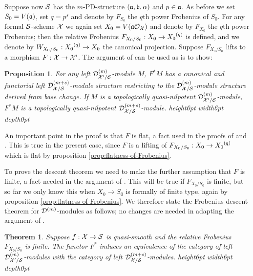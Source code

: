 \documentclass{article}
\theoremstyle{change}
\newtheorem{thm}[subsubsection]{Theorem}
\newtheorem{prop}[subsubsection]{Proposition}
\numberwithin{equation}{subsubsection}
\newcommand{\demobox}{\vrule height6pt width6pt depth0pt}
\newcommand{\nodemo}{\unskip\nobreak\hfil\qquad
\demobox\parfillskip=0pt\par}
\begin{document}
Suppose now ${\cal S}$ has the $m$-PD-structure $({\mathfrak a},{\mathfrak b},\alpha)$ and
$p\in{\mathfrak a}$. As before we set $S_0=V({\mathfrak a})$, set $q=p^s$ and denote by
$F_{S_0}$ the $q$th power Frobenius of $S_0$. For any formal
${\cal S}$-scheme ${\cal X}$ we again set $X_0=V({\mathfrak a}{\cal O}_{\cal X})$ and denote by
$F_{X_0}$ the $q$th power Frobenius; then the relative Frobenius
$F_{X_0/S_0}:X_0\to{X_0}^{({q})}$ is defined, and we denote by
$W_{X_0/S_0}:{X_0}^{({q})}\to X_0$ the canonical projection.  Suppose
$F_{X_0/S_0}$ lifts to a morphism $F:{\cal X}\to{\cal X}'$. The argument of
\cite[Prop. 2.2.2]{berthelot:2000} can be used as is to show:

\begin{prop}\label{prop:raising-the-level}
  For any left ${{\cal D}}^{({m})}_{{\cal X}'/{\cal S}}$-module $M$, $F^*M$ has a
  canonical and functorial left ${{\cal D}}^{({m+s})}_{{\cal X}/{\cal S}}$-module
  structure restricting to the ${{\cal D}}^{({m})}_{{\cal X}/{\cal S}}$-module
  structure derived from base change. If $M$ is a topologically
  quasi-nilpotent ${{\cal D}}^{({m})}_{{\cal X}'/{\cal S}}$-module, $F^*M$ is a
  topologically quasi-nilpotent
  ${{\cal D}}^{({m+s})}_{{\cal X}/{\cal S}}$-module.\nodemo
\end{prop}

An important point in the proof is that $F$ is flat, a fact used in
the proofs of \cite[Lemme 2.3.2]{berthelot:2000} and \cite[Lemme
2.3.3]{berthelot:2000}. This is true in the present case, since $F$ is
a lifting of $F_{X_0/S_0}:X_0\to{X_0}^{({q})}$ which is flat by
proposition \ref{prop:flatness-of-Frobenius}.

To prove the descent theorem we need to make the further assumption
that $F$ is finite, a fact needed in the argument of
\cite[Th\'eor\`eme 2.3.6]{berthelot:2000}. This will be true if
$F_{X_0/S_0}$ is finite, but so far we only know this when
$X_0\to S_0$ is formally of finite type, again by proposition
\ref{prop:flatness-of-Frobenius}. We therefore state the Frobenius
descent theorem for ${{\cal D}}^{({m})}$-modules as follows; no changes are
needed in adapting the argument of \cite[\S2.3]{berthelot:2000}.

\begin{thm}\label{thm:Frobenius-descent-D}
  Suppose $f:{\cal X}\to{\cal S}$ is quasi-smooth and the relative Frobenius
  $F_{X_0/S_0}$ is finite. The functor $F^*$ induces an equivalence of
  the category of left ${{\cal D}}^{({m})}_{{\cal X}'/{\cal S}}$-modules with the
  category of left ${{\cal D}}^{({m+s})}_{{\cal X}/{\cal S}}$-modules.\nodemo
\end{thm}
\end{document}
